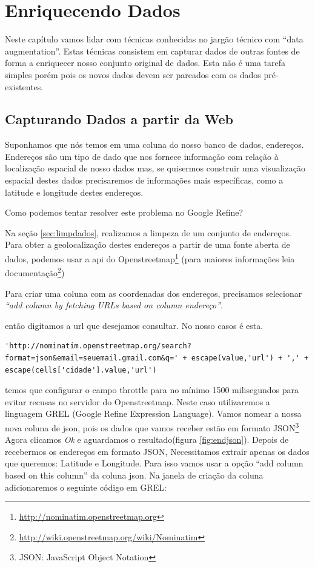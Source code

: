 \documentclass[a4paper,10pt]{report}
\begin{document}
\chapter{Enriquecendo Dados}
Neste capítulo vamos lidar com técnicas conhecidas no jargão técnico com ``data augmentation''. Estas técnicas consistem em capturar dados de outras fontes  de forma a enriquecer nosso conjunto original de dados. Esta não é uma tarefa simples porém pois os novos dados devem ser pareados com os dados pré-existentes.

\section{Capturando Dados a partir da Web}
Suponhamos que nós temos em uma coluna do nosso banco de dados, endereços. Endereços são um tipo de dado que nos fornece informação com relação à localização espacial de nosso dados mas, se quisermos construir uma visualização espacial destes dados precisaremos de informações mais específicas, como a latitude e longitude destes endereços.

Como podemos tentar resolver este problema no Google Refine?

Na seção \ref{sec:limpdados}, realizamos a limpeza de um conjunto de endereços. Para obter a geolocalização  destes endereços a partir de uma fonte aberta de dados, podemos usar a api do Openstreetmap\footnote{\url{http://nominatim.openstreetmap.org}} (para maiores informações leia documentação\footnote{\url{http://wiki.openstreetmap.org/wiki/Nominatim}})

Para criar uma coluna com as coordenadas dos endereços, precisamos selecionar \emph{``add column by fetching URLs based on column endereço''}.

então digitamos a url que desejamos consultar. No nosso casos é esta.

\begin{lstlisting}[]
'http://nominatim.openstreetmap.org/search?format=json&email=seuemail.gmail.com&q=' + escape(value,'url') + ',' + escape(cells['cidade'].value,'url')
\end{lstlisting}

temos que configurar o campo throttle para no mínimo 1500 milisegundos para evitar recusas no servidor do Openstreetmap. Neste caso utilizaremos a linguagem GREL (Google Refine Expression Language). Vamos nomear a nossa nova coluna de json, pois os dados que vamos receber estão em formato JSON\footnote{JSON: JavaScript Object Notation} Agora clicamos \emph{Ok} e aguardamos o resultado(figura \ref{fig:endjson}). Depois de recebermos os endereços em formato JSON, Necessitamos extrair apenas os dados que queremos: Latitude e Longitude. Para isso vamos usar a opção ``add column based on this column'' da coluna json. Na janela de criação da coluna adicionaremos o seguinte código em GREL:
\end{document}
